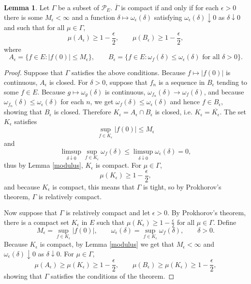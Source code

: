 \documentclass{article}
\theoremstyle{definition}
\newtheorem{lemma}[theorem]{Lemma}
\theoremstyle{definition}
\begin{document}
\begin{lemma}
Let $\Gamma$ be a subset of $\mathscr{P}_E$. $\overline{\Gamma}$ is compact if and only if for each $\epsilon>0$ there is some $M_\epsilon<\infty$ and a function
$\delta \mapsto \omega_\epsilon(\delta)$ satisfying $\omega_\epsilon(\delta) \downarrow 0$ as $\delta \downarrow 0$ and such that for all $\mu \in \Gamma$,
\[
\mu(A_\epsilon) \geq 1-\frac{\epsilon}{2},\qquad
\mu(B_\epsilon) \geq 1-\frac{\epsilon}{2},
\]
where
\[
A_\epsilon = \{f \in E : |f(0)| \leq M_\epsilon\},\qquad B_\epsilon = \{f \in E: \textrm{$\omega_f(\delta) \leq \omega_\epsilon(\delta)$ for all $\delta>0$}\}.
\]
\label{compactlemma}
\end{lemma}
\begin{proof}
Suppose that $\Gamma$ satisfies the above conditions. Because $f \mapsto |f(0)|$ is continuous, 
$A_\epsilon$ is closed. For $\delta>0$, suppose that $f_n$ is a sequence in $B_\epsilon$ tending
to some $f \in E$. Because $g \mapsto \omega_g(\delta)$ is continuous, $\omega_{f_n}(\delta)
\to \omega_f(\delta)$, and because $\omega_{f_n}(\delta) \leq \omega_\epsilon(\delta)$ for each
$n$, we get $\omega_f(\delta) \leq \omega_\epsilon(\delta)$ and hence $f \in B_\epsilon$, showing that
$B_\epsilon$ is closed. Therefore $K_\epsilon = A_\epsilon \cap B_\epsilon$ is closed, i.e.
$K_\epsilon = \overline{K_\epsilon}$. The set $K_\epsilon$ satisfies
\[
\sup_{f \in K_\epsilon} |f(0)| \leq M_\epsilon
\]
and
\[
\limsup_{\delta \downarrow 0} \sup_{f \in K_\epsilon} \omega_f(\delta)
\leq \limsup_{\delta \downarrow 0} \omega_\epsilon(\delta)
= 0,
\]
thus by Lemma \ref{modulus}, $K_\epsilon$ is compact.
For $\mu \in \Gamma$,
\[
\mu(K_\epsilon) \geq 1-\frac{\epsilon}{2},
\]
and because $K_\epsilon$ is compact, this means that $\Gamma$ is tight, so by
Prokhorov's theorem, $\Gamma$ is relatively compact. 

Now suppose that $\Gamma$ is relatively compact and let $\epsilon>0$. By Prokhorov's theorem,
there is a compact set $K_\epsilon$ in $E$ such that $\mu(K_\epsilon) \geq 1-\frac{\epsilon}{2}$ for all
$\mu \in \Gamma$. 
Define
\[
M_\epsilon = \sup_{f \in K_\epsilon} |f(0)|,
\qquad \omega_\epsilon(\delta) = \sup_{f \in K_\epsilon} \omega_f(\delta),\qquad \delta>0.
\]
Because $K_\epsilon$ is compact, by Lemma \ref{modulus} we get that 
$M_\epsilon<\infty$ and $\omega_\epsilon(\delta) \downarrow 0$ as $\delta \downarrow 0$. 
For $\mu \in \Gamma$, 
\[
\mu(A_\epsilon) \geq \mu(K_\epsilon) \geq 1-\frac{\epsilon}{2},
\qquad \mu(B_\epsilon) \geq \mu(K_\epsilon) \geq 1-\frac{\epsilon}{2},
\]
showing that $\Gamma$ satisfies the conditions of the theorem.
\end{proof}
\end{document}
